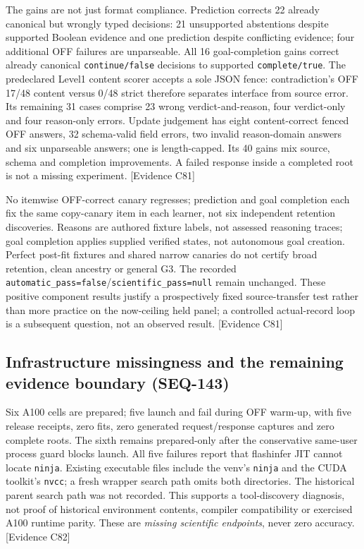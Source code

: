 \documentclass[11pt]{article}
\begin{document}
The gains are not just format compliance. Prediction corrects 22 already
canonical but wrongly typed decisions: 21 unsupported abstentions despite
supported Boolean evidence and one prediction despite conflicting evidence;
four additional OFF failures are unparseable. All 16 goal-completion gains
correct already canonical \texttt{continue/false} decisions to supported
\texttt{complete/true}. The predeclared Level1 content scorer accepts a sole
JSON fence: contradiction's OFF 17/48 content versus 0/48 strict therefore
separates interface from source error. Its remaining 31 cases comprise 23 wrong
verdict-and-reason, four verdict-only and four reason-only errors. Update
judgement has eight content-correct fenced OFF answers, 32 schema-valid field
errors, two invalid reason-domain answers and six unparseable answers; one is
length-capped. Its 40 gains mix source, schema and completion improvements.
A failed response inside a completed root is not a missing experiment.
\textsf{[Evidence C81]}

No itemwise OFF-correct canary regresses; prediction and goal completion each
fix the same copy-canary item in each learner, not six independent retention
discoveries. Reasons are authored fixture labels, not assessed reasoning traces;
goal completion applies supplied verified states, not autonomous goal creation.
Perfect post-fit fixtures and shared narrow canaries do not certify broad
retention, clean ancestry or general G3. The recorded
\texttt{automatic\_pass=false}/\texttt{scientific\_pass=null} remain unchanged.
These positive component results justify a prospectively fixed source-transfer
test rather than more practice on the now-ceiling held panel; a controlled
actual-record loop is a subsequent question, not an observed result.
\textsf{[Evidence C81]}

\subsection{Infrastructure missingness and the remaining evidence boundary (SEQ-143)}
\label{sec:bounded-infrastructure}
Six A100 cells are prepared; five launch and fail during OFF warm-up, with
five release receipts, zero fits, zero generated request/response captures and
zero complete roots. The sixth remains prepared-only after the conservative
same-user process guard blocks launch. All five failures report that flashinfer
JIT cannot locate \texttt{ninja}. Existing executable files include the venv's
\texttt{ninja} and the CUDA toolkit's \texttt{nvcc}; a fresh wrapper search path
omits both directories. The historical parent search path was not recorded.
This supports a tool-discovery diagnosis, not proof of historical environment
contents, compiler compatibility or exercised A100 runtime parity. These are
\emph{missing scientific endpoints}, never zero accuracy. \textsf{[Evidence C82]}
\end{document}
